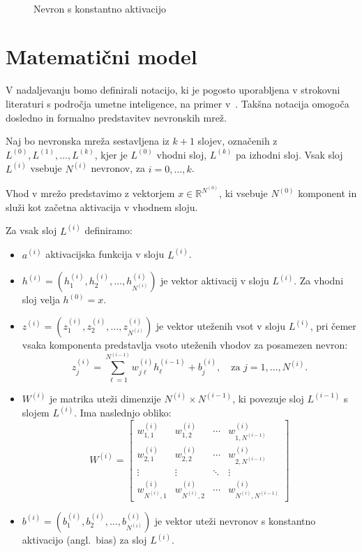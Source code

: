\begin{figure}[H]
  \centering
  
  \caption{Nevron s konstantno aktivacijo}~\label{fig:nn-bias}
\end{figure}


\section{Matematični model}

V nadaljevanju bomo definirali notacijo, ki je pogosto uporabljena v strokovni literaturi s področja umetne inteligence, na primer v~\cite{Hastie2009}. Takšna notacija omogoča dosledno in formalno predstavitev nevronskih mrež.

Naj bo nevronska mreža sestavljena iz $k+1$ slojev, označenih z $L^{(0)}, L^{(1)}, \dots, L^{(k)}$, kjer je $L^{(0)}$ vhodni sloj, $L^{(k)}$ pa izhodni sloj. Vsak sloj $L^{(i)}$ vsebuje $N^{(i)}$ nevronov, za $i = 0, \dots, k$.

Vhod v mrežo predstavimo z vektorjem $x \in \mathbb{R}^{N^{(0)}}$, ki vsebuje $N^{(0)}$ komponent in služi kot začetna aktivacija v vhodnem sloju.

Za vsak sloj $L^{(i)}$ definiramo:

\begin{itemize}
  \item $a^{(i)}$ aktivacijska funkcija v sloju $L^{(i)}$.
  
  \item $h^{(i)} = \left(h^{(i)}_1, h^{(i)}_2, \dots, h^{(i)}_{N^{(i)}}\right)$ je vektor aktivacij v sloju $L^{(i)}$. Za vhodni sloj velja $h^{(0)} = x$.
  
  \item $z^{(i)} = \left(z^{(i)}_1, z^{(i)}_2, \dots, z^{(i)}_{N^{(i)}}\right)$ je vektor uteženih vsot v sloju $L^{(i)}$, pri čemer vsaka komponenta predstavlja vsoto uteženih vhodov za posamezen nevron:
  \[
    z^{(i)}_j = \sum_{\ell=1}^{N^{(i-1)}} w^{(i)}_{j\ell} h^{(i-1)}_\ell + b^{(i)}_j, \quad \text{za } j = 1, \dots, N^{(i)}.
  \]

  \item $W^{(i)}$ je matrika uteži dimenzije $N^{(i)} \times N^{(i-1)}$, ki povezuje sloj $L^{(i-1)}$ s slojem $L^{(i)}$. Ima naslednjo obliko:
  \[
    W^{(i)} = \begin{bmatrix}
      w^{(i)}_{1,1} & w^{(i)}_{1,2} & \cdots & w^{(i)}_{1,N^{(i-1)}} \\
      w^{(i)}_{2,1} & w^{(i)}_{2,2} & \cdots & w^{(i)}_{2,N^{(i-1)}} \\
      \vdots       & \vdots       & \ddots & \vdots               \\
      w^{(i)}_{N^{(i)},1} & w^{(i)}_{N^{(i)},2} & \cdots & w^{(i)}_{N^{(i)},N^{(i-1)}}
    \end{bmatrix}
  \]

  \item $b^{(i)} = \left(b^{(i)}_1, b^{(i)}_2, \dots, b^{(i)}_{N^{(i)}}\right)$ je vektor uteži nevronov s konstantno aktivacijo (angl.\ bias) za sloj $L^{(i)}$.
\end{itemize}

